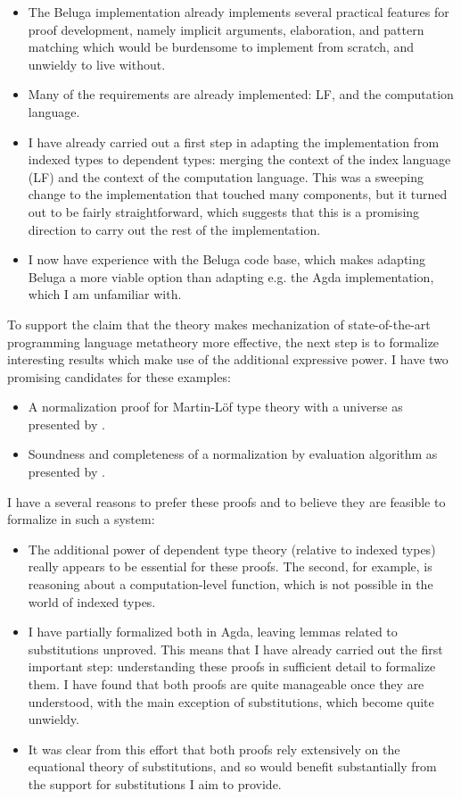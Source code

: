\documentclass{article}
\begin{document}
\begin{itemize}
\item The Beluga implementation already implements several practical
features for proof development, namely implicit arguments, elaboration, and pattern
matching which would be burdensome to implement from scratch, and
unwieldy to live without.
\item Many of the requirements are already implemented: LF, and
the computation language.
\item I have already carried out a first step in
adapting the implementation from indexed
types to dependent types: merging the context of the index language
(LF) and the context of the computation language. This was a sweeping
change to the implementation that touched many components, but it turned
out to be fairly straightforward, which suggests that this is a
promising direction to carry out the rest of the
implementation.
\item I now have experience with the Beluga
code base, which makes adapting Beluga a more viable option than 
adapting e.g. the Agda implementation, which I am unfamiliar with.
\end{itemize}

To support the claim that the theory makes mechanization of
state-of-the-art programming language metatheory more effective, the
next step is to formalize interesting results which make use of the
additional expressive power. I have two promising candidates for these examples:

\begin{itemize}
\item A normalization proof for Martin-L\"of type theory with
  a universe as presented by \cite{Coquand98}.
\item Soundness and completeness of a normalization by evaluation algorithm
as presented by \cite{Dybjer00}. 
\end{itemize}

I have a several reasons to prefer these proofs and to believe they
are feasible to formalize in such a system:

\begin{itemize}
\item The additional power of dependent type theory (relative to indexed
types) really appears to be essential for these proofs. The second,
for example, is reasoning about a computation-level function,
 which is not possible in the world of indexed types.
\item I have partially formalized both in Agda, leaving lemmas related
  to substitutions unproved. This means that I have already carried
  out the first important step: understanding these proofs in sufficient
  detail to formalize them. I have found that both proofs are quite
  manageable once they are understood, with the main exception of
  substitutions, which become quite unwieldy.
\item It was clear from this effort that both proofs rely
  extensively on the equational theory of substitutions, and so would
  benefit substantially from the support for substitutions I aim to provide.
\end{itemize} 
\end{document}
